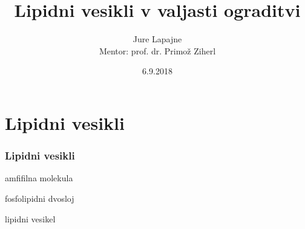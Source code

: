 \documentclass[slovene]{beamer}
\title{Lipidni vesikli v valjasti ograditvi}
\author[Jure Lapajne]{Jure Lapajne\\{\small Mentor: prof. dr. Primož Ziherl}}
\date{6.9.2018}
\begin{document}
	
	\frame{\titlepage}
	\setlength{\abovedisplayskip}{3pt}
	\setlength{\belowdisplayskip}{3pt}


	
\section{Lipidni vesikli}

\begin{frame}
	\frametitle{Lipidni vesikli}
	\begin{minipage}[]{0.17\linewidth}
		amfifilna molekula
	\end{minipage}%
	\begin{minipage}{0.12\linewidth}
	\end{minipage}%
	\begin{minipage}[]{0.35\linewidth}
		\centering
		fosfolipidni dvosloj
	\end{minipage}
	\begin{minipage}{0.12\linewidth}
	\end{minipage}%
	\begin{minipage}[]{0.2\linewidth}
		lipidni vesikel	
	\end{minipage}
	\\
	\vspace{0.2cm}
	

\end{frame}
\end{document}
